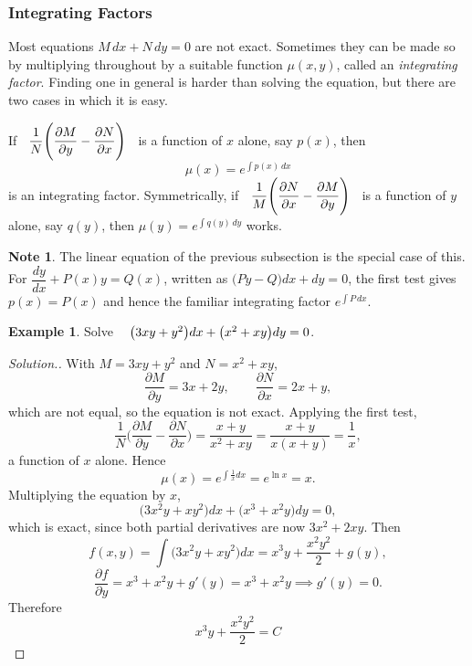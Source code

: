 \documentclass[11pt,a4paper]{article}
\theoremstyle{definition}
\newtheorem{exa}[thm]{Example}
\newtheorem*{note}{Note}
\newenvironment{solution}
  {\renewcommand{\qedsymbol}{}\begin{proof}[\textit{Solution}.]}
  {\end{proof}}
\begin{document}
\subsubsection{Integrating Factors}

Most equations $M\,dx + N\,dy = 0$ are not exact. Sometimes they can be made so
by multiplying throughout by a suitable function $\mu(x,y)$, called an
\emph{integrating factor}. Finding one in general is harder than solving the
equation, but there are two cases in which it is easy.

If $\hspace{0.2cm}\displaystyle{\frac{1}{N}\Bigg(\frac{\partial M}{\partial y}
- \frac{\partial N}{\partial x}\Bigg)}\hspace{0.2cm}$ is a function of $x$ alone,
say $p(x)$, then
$$\boxed{\mu(x) = e^{\int p(x)\,dx}}$$
is an integrating factor. Symmetrically, if
$\hspace{0.2cm}\displaystyle{\frac{1}{M}\Bigg(\frac{\partial N}{\partial x}
- \frac{\partial M}{\partial y}\Bigg)}\hspace{0.2cm}$ is a function of $y$
alone, say $q(y)$, then $\mu(y) = e^{\int q(y)\,dy}$ works.

\begin{note}
The linear equation of the previous subsection is the special case of this. For
$\dfrac{dy}{dx} + P(x)y = Q(x)$, written as
$\big(Py - Q\big)dx + dy = 0$, the first test gives $p(x) = P(x)$ and hence the
familiar integrating factor $e^{\int P\,dx}$.
\end{note}

\begin{exa}
Solve $\hspace{0.3cm}\big(3xy + y^2\big)dx + \big(x^2 + xy\big)dy = 0$.
\end{exa}

\begin{solution}
With $M = 3xy + y^2$ and $N = x^2 + xy$,
$$\frac{\partial M}{\partial y} = 3x + 2y,\qquad
\frac{\partial N}{\partial x} = 2x + y,$$
which are not equal, so the equation is not exact. Applying the first test,
$$\frac{1}{N}\Bigg(\frac{\partial M}{\partial y} - \frac{\partial N}{\partial x}\Bigg)
= \frac{x + y}{x^2 + xy} = \frac{x+y}{x(x+y)} = \frac{1}{x},$$
a function of $x$ alone. Hence
$$\mu(x) = e^{\int \frac{1}{x}dx} = e^{\ln x} = x .$$
Multiplying the equation by $x$,
$$\big(3x^2y + xy^2\big)dx + \big(x^3 + x^2y\big)dy = 0 ,$$
which is exact, since both partial derivatives are now $3x^2 + 2xy$. Then
$$f(x,y) = \int\big(3x^2y + xy^2\big)dx = x^3y + \frac{x^2y^2}{2} + g(y),$$
$$\frac{\partial f}{\partial y} = x^3 + x^2y + g'(y) = x^3 + x^2y
\implies g'(y) = 0 .$$
Therefore
$$\boxed{x^3y + \frac{x^2y^2}{2} = C}$$
\end{solution}
\end{document}
